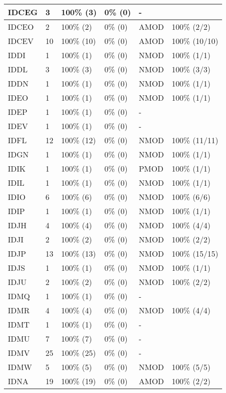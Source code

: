 \begin{figure*}
\begin{tabular}{|l|l|l|l||l|l|}
\hline
 IDCEG & 3 & 100\% (3) & 0\% (0) & - &  \\ 
\hline
 IDCEO & 2 & 100\% (2) & 0\% (0) & AMOD & 100\% (2/2) \\ 
\hline
 IDCEV & 10 & 100\% (10) & 0\% (0) & AMOD & 100\% (10/10) \\ 
\hline
 IDDI & 1 & 100\% (1) & 0\% (0) & NMOD & 100\% (1/1) \\ 
\hline
 IDDL & 3 & 100\% (3) & 0\% (0) & NMOD & 100\% (3/3) \\ 
\hline
 IDDN & 1 & 100\% (1) & 0\% (0) & NMOD & 100\% (1/1) \\ 
\hline
 IDEO & 1 & 100\% (1) & 0\% (0) & NMOD & 100\% (1/1) \\ 
\hline
 IDEP & 1 & 100\% (1) & 0\% (0) & - &  \\ 
\hline
 IDEV & 1 & 100\% (1) & 0\% (0) & - &  \\ 
\hline
 IDFL & 12 & 100\% (12) & 0\% (0) & NMOD & 100\% (11/11) \\ 
\hline
 IDGN & 1 & 100\% (1) & 0\% (0) & NMOD & 100\% (1/1) \\ 
\hline
 IDIK & 1 & 100\% (1) & 0\% (0) & PMOD & 100\% (1/1) \\ 
\hline
 IDIL & 1 & 100\% (1) & 0\% (0) & NMOD & 100\% (1/1) \\ 
\hline
 IDIO & 6 & 100\% (6) & 0\% (0) & NMOD & 100\% (6/6) \\ 
\hline
 IDIP & 1 & 100\% (1) & 0\% (0) & NMOD & 100\% (1/1) \\ 
\hline
 IDJH & 4 & 100\% (4) & 0\% (0) & NMOD & 100\% (4/4) \\ 
\hline
 IDJI & 2 & 100\% (2) & 0\% (0) & NMOD & 100\% (2/2) \\ 
\hline
 IDJP & 13 & 100\% (13) & 0\% (0) & NMOD & 100\% (15/15) \\ 
\hline
 IDJS & 1 & 100\% (1) & 0\% (0) & NMOD & 100\% (1/1) \\ 
\hline
 IDJU & 2 & 100\% (2) & 0\% (0) & NMOD & 100\% (2/2) \\ 
\hline
 IDMQ & 1 & 100\% (1) & 0\% (0) & - &  \\ 
\hline
 IDMR & 4 & 100\% (4) & 0\% (0) & NMOD & 100\% (4/4) \\ 
\hline
 IDMT & 1 & 100\% (1) & 0\% (0) & - &  \\ 
\hline
 IDMU & 7 & 100\% (7) & 0\% (0) & - &  \\ 
\hline
 IDMV & 25 & 100\% (25) & 0\% (0) & - &  \\ 
\hline
 IDMW & 5 & 100\% (5) & 0\% (0) & NMOD & 100\% (5/5) \\ 
\hline
 IDNA & 19 & 100\% (19) & 0\% (0) & AMOD & 100\% (2/2) \\ 
\hline
\end{tabular}
\end{figure*}
